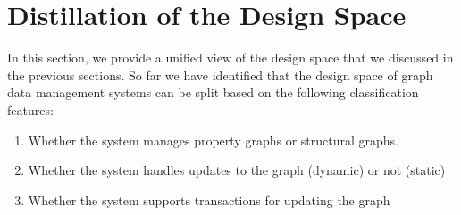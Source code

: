 



\section{Distillation of the Design Space}
\label{design:distillation}
In this section, we provide a unified view of the design space that we discussed in the previous sections.
So far we have identified that the design space of graph data management systems can be split based on the following classification features:
\begin{enumerate}
  \item Whether the system manages property graphs or structural graphs.
  \item Whether the system handles updates to the graph (dynamic) or not (static)
  \item Whether the system supports transactions for updating the graph
\end{enumerate}

